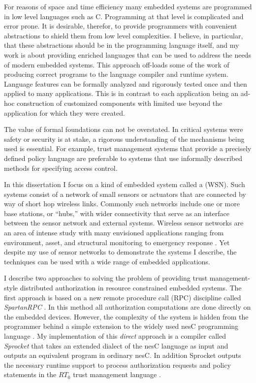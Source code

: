 For reasons of space and time efficiency many embedded systems are programmed in low level
languages such as C. Programming at that level is complicated and error prone. It is desirable,
therefor, to provide programmers with convenient abstractions to shield them from low level
complexities. I believe, in particular, that these abstractions should be in the programming
language itself, and my work is about providing enriched languages that can be used to address
the needs of modern embedded systems. This  approach off-loads some of
the work of producing correct programs to the language compiler and runtime system. Language
features can be formally analyzed and rigorously tested once and then applied to many
applications. This is in contrast to each application being an ad-hoc construction of customized
components with limited use beyond the application for which they were created.

The value of formal foundations can not be overstated. In critical systems were safety or
security is at stake, a rigorous understanding of the mechanisms being used is essential. For
example, trust management systems that provide a precisely defined policy language are
preferable to systems that use informally described methods for specifying access control.

In this dissertation I focus on a kind of embedded system called a  (WSN). Such systems consist of a network of small sensors or actuators that are
connected by way of short hop wireless links. Commonly such networks include one or more base
stations, or ``hubs,'' with wider connectivity that serve as an interface between the sensor
network and external systems. Wireless sensor networks are an area of intense study with many
envisioned applications ranging from environment, asset, and structural monitoring to emergency
response \cite{Culler:2004:GEI:1018015.1018072,1038146}. Yet despite my use of sensor networks
to demonstrate the systems I describe, the techniques can be used with a wide range of embedded
applications.

I describe two approaches to solving the problem of providing trust management-style distributed
authorization in resource constrained embedded systems. The first approach is based on a new
remote procedure call (RPC) discipline called \textit{SpartanRPC}
\cite{chapin-skalka-SpartanRPC,chapin-skalka-SpartanRPCTR}. In this method all authorization
computations are done directly on the embedded devices. However, the complexity of the system is
hidden from the programmer behind a simple extension to the widely used nesC programming
language \cite{Gay-nesC-2003}. My implementation of this \emph{direct} approach is a compiler
called \textit{Sprocket} that takes an extended dialect of the nesC language as input and
outputs an equivalent program in ordinary nesC. In addition Sprocket outputs the necessary
runtime support to process authorization requests and policy statements in the $RT_0$ trust
management language \cite{Li:DRBTMF,Li:RRBTMF}.

